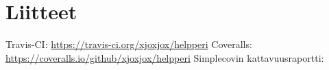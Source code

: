 \documentclass[a4paper,12pt, titlepage]{article}
\begin{document}
\section{Liitteet}

Travis-CI:
\url{https://travis-ci.org/xjoxjox/helpperi}
\newline
Coveralls:
\url{https://coveralls.io/github/xjoxjox/helpperi}
\newline
\newline
Simplecovin kattavuusraportti:
\newline
\newline
\noindent{}
\end{document}
